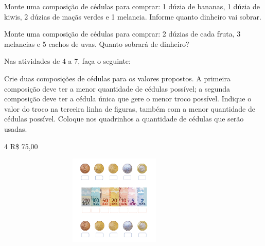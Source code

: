 \begin{escolha}
\item Monte uma composição de cédulas para comprar: 1 dúzia de bananas, 1 dúzia de kiwis, 2 dúzias de maçãs verdes e 1 melancia. Informe quanto dinheiro vai sobrar.

\reduline{\mbox{}\hfill}
\reduline{\mbox{}\hfill}
\reduline{\mbox{}\hfill}

\item Monte uma composição de cédulas para comprar: 2 dúzias de cada fruta, 3 melancias e 5 cachos de uvas. Quanto sobrará de dinheiro?

\reduline{\mbox{}\hfill}
\reduline{\mbox{}\hfill}
\reduline{\mbox{}\hfill}
\end{escolha}

Nas atividades de 4 a 7, faça o seguinte:

Crie duas composições de cédulas para os valores propostos. A primeira composição deve ter a menor quantidade de cédulas possível; a segunda composição deve ter a cédula única que gere o menor troco possível. Indique o valor do troco na terceira linha de figuras, também com a menor quantidade de cédulas possível. Coloque nos quadrinhos a quantidade de cédulas que serão usadas.



\num{4} R\$ 75,00

\includegraphics[width=4.45833in,height=1.68116in]{media/image72.png}

